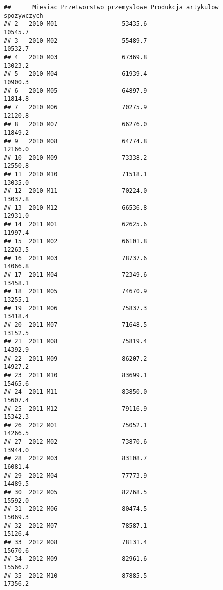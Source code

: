 \documentclass[
]{article}
\begin{document}
\begin{verbatim}
##      Miesiac Przetworstwo przemyslowe Produkcja artykulow spozywczych
## 2   2010 M01                  53435.6                         10545.7
## 3   2010 M02                  55489.7                         10532.7
## 4   2010 M03                  67369.8                         13023.2
## 5   2010 M04                  61939.4                         10900.3
## 6   2010 M05                  64897.9                         11814.8
## 7   2010 M06                  70275.9                         12120.8
## 8   2010 M07                  66276.0                         11849.2
## 9   2010 M08                  64774.8                         12166.0
## 10  2010 M09                  73338.2                         12550.8
## 11  2010 M10                  71518.1                         13035.0
## 12  2010 M11                  70224.0                         13037.8
## 13  2010 M12                  66536.8                         12931.0
## 14  2011 M01                  62625.6                         11997.4
## 15  2011 M02                  66101.8                         12263.5
## 16  2011 M03                  78737.6                         14066.8
## 17  2011 M04                  72349.6                         13458.1
## 18  2011 M05                  74670.9                         13255.1
## 19  2011 M06                  75837.3                         13418.4
## 20  2011 M07                  71648.5                         13152.5
## 21  2011 M08                  75819.4                         14392.9
## 22  2011 M09                  86207.2                         14927.2
## 23  2011 M10                  83699.1                         15465.6
## 24  2011 M11                  83850.0                         15607.4
## 25  2011 M12                  79116.9                         15342.3
## 26  2012 M01                  75052.1                         14266.5
## 27  2012 M02                  73870.6                         13944.0
## 28  2012 M03                  83108.7                         16081.4
## 29  2012 M04                  77773.9                         14489.5
## 30  2012 M05                  82768.5                         15592.0
## 31  2012 M06                  80474.5                         15069.3
## 32  2012 M07                  78587.1                         15126.4
## 33  2012 M08                  78131.4                         15670.6
## 34  2012 M09                  82961.6                         15566.2
## 35  2012 M10                  87885.5                         17356.2

\end{verbatim}
\end{document}
